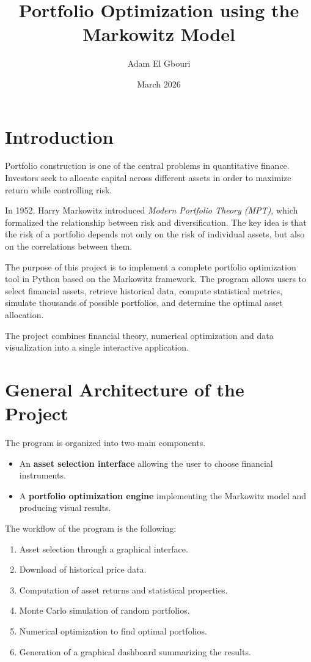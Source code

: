 \documentclass[11pt,a4paper]{article}
\title{Portfolio Optimization using the Markowitz Model}
\author{Adam El Gbouri}
\date{March 2026}
\begin{document}
\maketitle

\section{Introduction}

Portfolio construction is one of the central problems in quantitative finance. 
Investors seek to allocate capital across different assets in order to maximize return while controlling risk. 

In 1952, Harry Markowitz introduced \textit{Modern Portfolio Theory (MPT)}, which formalized the relationship between risk and diversification. 
The key idea is that the risk of a portfolio depends not only on the risk of individual assets, but also on the correlations between them.

The purpose of this project is to implement a complete portfolio optimization tool in Python based on the Markowitz framework. 
The program allows users to select financial assets, retrieve historical data, compute statistical metrics, simulate thousands of possible portfolios, and determine the optimal asset allocation.

The project combines financial theory, numerical optimization and data visualization into a single interactive application.

\section{General Architecture of the Project}

The program is organized into two main components.

\begin{itemize}
\item An \textbf{asset selection interface} allowing the user to choose financial instruments.
\item A \textbf{portfolio optimization engine} implementing the Markowitz model and producing visual results.
\end{itemize}

The workflow of the program is the following:

\begin{enumerate}
\item Asset selection through a graphical interface.
\item Download of historical price data.
\item Computation of asset returns and statistical properties.
\item Monte Carlo simulation of random portfolios.
\item Numerical optimization to find optimal portfolios.
\item Generation of a graphical dashboard summarizing the results.
\end{enumerate}
\end{document}
